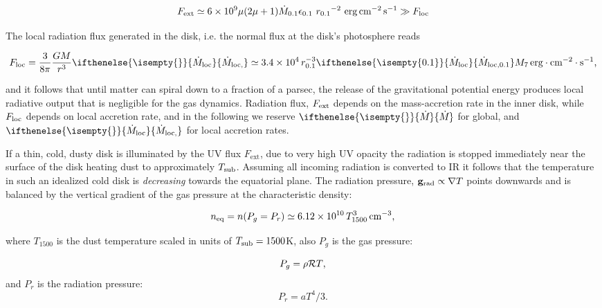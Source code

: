 \documentclass[12pt,english,preprint]{aastex}
\newcommand{\txt}{\text}
\newcommand{\su}[2]{#1_{\rm #2}}
\newcommand{\mdt}[1][]{ 
  \ifthenelse{\isempty{#1}}
  {\dot{M}_{\rm loc}}
  { {\dot M}_{\rm{loc},{#1}} } 
  } %
\newcommand{\Mdt}[1][]{ 
    \ifthenelse{\isempty{#1}}
    {\dot{M}_{}}
    { {\dot M}_{{#1}} } 
} %
\newcommand{\Tsub}{ \su{T}{sub} }
\begin{document}
\begin{equation}
F_{{\rm ext}}\simeq6\times10^{9}\mu(2\mu+1){\dot{M}}_{0.1}\epsilon_{0.1}\ r_{0.1}{}^{-2}\,\,{\rm erg}{\rm \,cm^{-2}{\rm \,s^{-1}}}\gg F_{{\rm loc}}\label{eq:FluxAGNanisotr}
\end{equation}

The local radiation flux generated in the disk, i.e. the normal flux at the disk's photosphere reads

\begin{equation}
F_{{\rm loc}}=\frac{3}{8\pi}\frac{GM}{r^{3}}\mdt\simeq3.4\times10^{4}
\,r_{0.1}^{-3}\mdt[0.1] M_{7}{\rm \,erg}\cdot{\rm cm^{-2}}\cdot{\rm s}^{-1}\mbox{,}\label{eq:DiskLocFlux}
\end{equation}

\noindent and it follows that until matter can spiral down to a fraction of a parsec, the release of the
gravitational potential energy produces local radiative output that
is negligible for the gas dynamics. Radiation flux, $\su{F}{ext}$ depends on the mass-accretion rate in the inner disk, 
while $F_{{\rm loc}}$ depends on local accretion rate, and in the following we reserve $\Mdt$ for global, and $\mdt$ for local 
accretion rates.

If a thin, cold, dusty disk is illuminated by the UV flux $F_\txt{ext}$, 
due to very high UV opacity the radiation is stopped immediately near the surface of the disk
heating dust to approximately $\Tsub$. Assuming all incoming radiation is converted to IR it follows 
that the temperature in such an idealized cold disk is {\it decreasing} towards the equatorial plane.
The radiation pressure, ${\bf g}_\txt{rad}\propto \nabla T$ points downwards and 
is balanced by the vertical gradient of the gas pressure at the characteristic density: 

\begin{equation}
\su{n}{eq} =n(P_g=P_r) \simeq 6.12 \times 10^{10}\,T_{1500}^{3}\,{\rm cm^{-3}}\mbox{,}
\label{eq:densPgas=Prad}    
\end{equation}

\noindent where $T_{1500}$ is the dust temperature scaled in units of $\Tsub=1500$K, also $P_g$ is the gas pressure:

\begin{equation}
P_{g} = \rho{\cal R}T\mbox{,}\label{eq:Pgas}\\
\end{equation}
and $P_r$ is the radiation pressure:  
\begin{equation}
P_r  =  aT^{4}/3\mbox{.}\label{eq:Prad}
\end{equation}
\end{document}
